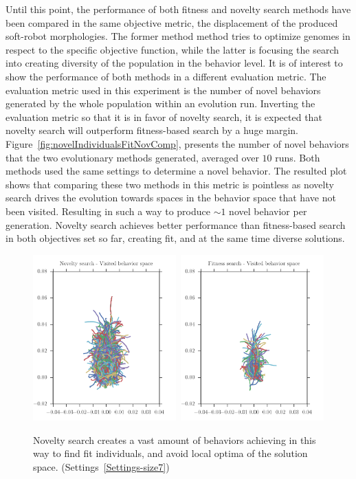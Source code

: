Until this point, the performance of both fitness and novelty search methods have been compared in the same objective metric, the displacement of the produced soft-robot morphologies. The former method method tries to optimize genomes in respect to the specific objective function, while the latter is focusing the search into creating diversity of the population in the behavior level. It is of interest to show the performance of both methods in a different evaluation metric. The evaluation metric used in this experiment is the number of novel behaviors generated by the whole population within an evolution run. Inverting the evaluation metric so that it is in favor of novelty search, it is expected that novelty search will outperform fitness-based search by a huge margin. Figure~\ref{fig:novelIndividualsFitNovComp}, presents the number of novel behaviors that the two evolutionary methods generated, averaged over $10$ runs. Both methods used the same settings to determine a novel behavior. The resulted plot shows that comparing these two methods in this metric is pointless as novelty search drives the evolution towards spaces in the behavior space that have not been visited. Resulting in such a way to produce $\sim 1$ novel behavior per generation. Novelty search achieves better performance than fitness-based search in both objectives set so far, creating fit, and at the same time diverse solutions.
\begin{figure}[t!]
\centering
\includegraphics[width=0.49\textwidth]{../Figures/Behaviors/behaviorsNovelty.pdf}\	
\includegraphics[width=0.49\textwidth]{../Figures/Behaviors/behaviorsFitness.pdf}
\caption{Novelty search creates a vast amount of behaviors achieving in this way to find fit individuals, and avoid local optima of the solution space. (Settings~\ref{Settings-size7})}
\label{fig:behaviorSpaceDiversity}
\end{figure}
